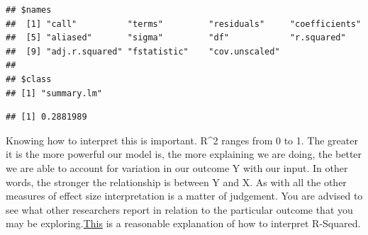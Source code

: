 \documentclass[
]{book}
\newenvironment{Shaded}{\begin{snugshade}}{\end{snugshade}}
\newcommand{\CommentTok}[1]{\textcolor[rgb]{0.56,0.35,0.01}{\textit{#1}}}
\newcommand{\FunctionTok}[1]{\textcolor[rgb]{0.00,0.00,0.00}{#1}}
\newcommand{\NormalTok}[1]{#1}
\newcommand{\SpecialCharTok}[1]{\textcolor[rgb]{0.00,0.00,0.00}{#1}}
\begin{document}
\begin{verbatim}
## $names
##  [1] "call"          "terms"         "residuals"     "coefficients" 
##  [5] "aliased"       "sigma"         "df"            "r.squared"    
##  [9] "adj.r.squared" "fstatistic"    "cov.unscaled" 
## 
## $class
## [1] "summary.lm"
\end{verbatim}

\begin{Shaded}
\end{Shaded}

\begin{verbatim}
## [1] 0.2881989
\end{verbatim}

Knowing how to interpret this is important. R\^{}2 ranges from 0 to 1. The greater it is the more powerful our model is, the more explaining we are doing, the better we are able to account for variation in our outcome Y with our input. In other words, the stronger the relationship is between Y and X. As with all the other measures of effect size interpretation is a matter of judgement. You are advised to see what other researchers report in relation to the particular outcome that you may be exploring.\href{http://blog.minitab.com/blog/adventures-in-statistics/regression-analysis-how-do-i-interpret-r-squared-and-assess-the-goodness-of-fit}{This} is a reasonable explanation of how to interpret R-Squared.
\end{document}
